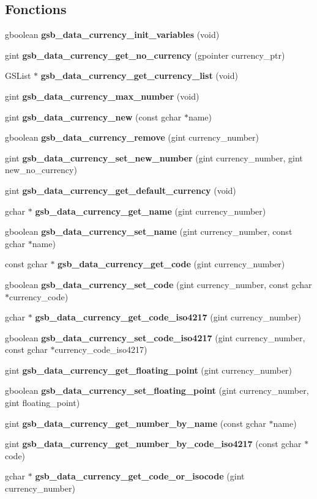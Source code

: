 \subsection*{Fonctions}
\begin{DoxyCompactItemize}
\item 
gboolean {\bf gsb\_\-data\_\-currency\_\-init\_\-variables} (void)
\item 
gint {\bf gsb\_\-data\_\-currency\_\-get\_\-no\_\-currency} (gpointer currency\_\-ptr)
\item 
GSList $\ast$ {\bf gsb\_\-data\_\-currency\_\-get\_\-currency\_\-list} (void)
\item 
gint {\bf gsb\_\-data\_\-currency\_\-max\_\-number} (void)
\item 
gint {\bf gsb\_\-data\_\-currency\_\-new} (const gchar $\ast$name)
\item 
gboolean {\bf gsb\_\-data\_\-currency\_\-remove} (gint currency\_\-number)
\item 
gint {\bf gsb\_\-data\_\-currency\_\-set\_\-new\_\-number} (gint currency\_\-number, gint new\_\-no\_\-currency)
\item 
gint {\bf gsb\_\-data\_\-currency\_\-get\_\-default\_\-currency} (void)
\item 
gchar $\ast$ {\bf gsb\_\-data\_\-currency\_\-get\_\-name} (gint currency\_\-number)
\item 
gboolean {\bf gsb\_\-data\_\-currency\_\-set\_\-name} (gint currency\_\-number, const gchar $\ast$name)
\item 
const gchar $\ast$ {\bf gsb\_\-data\_\-currency\_\-get\_\-code} (gint currency\_\-number)
\item 
gboolean {\bf gsb\_\-data\_\-currency\_\-set\_\-code} (gint currency\_\-number, const gchar $\ast$currency\_\-code)
\item 
gchar $\ast$ {\bf gsb\_\-data\_\-currency\_\-get\_\-code\_\-iso4217} (gint currency\_\-number)
\item 
gboolean {\bf gsb\_\-data\_\-currency\_\-set\_\-code\_\-iso4217} (gint currency\_\-number, const gchar $\ast$currency\_\-code\_\-iso4217)
\item 
gint {\bf gsb\_\-data\_\-currency\_\-get\_\-floating\_\-point} (gint currency\_\-number)
\item 
gboolean {\bf gsb\_\-data\_\-currency\_\-set\_\-floating\_\-point} (gint currency\_\-number, gint floating\_\-point)
\item 
gint {\bf gsb\_\-data\_\-currency\_\-get\_\-number\_\-by\_\-name} (const gchar $\ast$name)
\item 
gint {\bf gsb\_\-data\_\-currency\_\-get\_\-number\_\-by\_\-code\_\-iso4217} (const gchar $\ast$code)
\item 
gchar $\ast$ {\bf gsb\_\-data\_\-currency\_\-get\_\-code\_\-or\_\-isocode} (gint currency\_\-number)
\end{DoxyCompactItemize}


